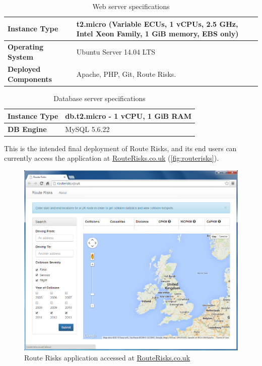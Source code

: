 \documentclass[authoryearcitations]{UoYCSproject}
\begin{document}
\begin{table}
	\center
	\caption{Web server specifications}
	\label{tab:serverspecs}
	\begin{tabular}{| p{4cm} | p{9cm} |}
	\hline
	\textbf{Instance Type} & t2.micro (Variable ECUs, 1 vCPUs, 2.5 GHz, Intel Xeon Family, 1 GiB memory, EBS only) \\ \hline
	\textbf{Operating System} & Ubuntu Server 14.04 LTS \\ \hline
	\textbf{Deployed Components} & Apache, PHP, Git, Route Risks. \\ \hline
	\end{tabular}
\end{table}

\begin{table}
	\center
	\caption{Database server specifications}
	\label{tab:dbserverspecs}
	\begin{tabular}{| p{4cm} | p{9cm} |}
	\hline
	\textbf{Instance Type} & db.t2.micro - 1 vCPU, 1 GiB RAM \\ \hline
	\textbf{DB Engine} & MySQL  5.6.22 \\ \hline
	\end{tabular}
\end{table}

This is the intended final deployment of Route Risks, and its end users can currently access the application at \url{RouteRisks.co.uk} (\autoref{fig:routerisks}).

\begin{figure}
	\center
	\includegraphics[scale=0.55]{routerisks}
	\caption{Route Risks application accessed at \url{RouteRisks.co.uk}}
	\label{fig:routerisks}
\end{figure}
\end{document}
